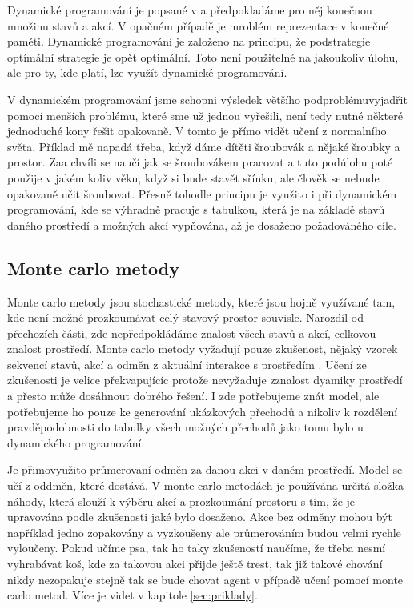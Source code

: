 \documentclass{article}
\begin{document}
Dynamické programování je popsané v \cite{sutton1998introduction} a předpokladáme pro něj konečnou množinu stavů a akcí. V opačném případě je mroblém reprezentace v konečné paměti. Dynamické programování je založeno na principu, že podstrategie optímální strategie je opět optimální. Toto není použitelné na jakoukoliv úlohu, ale pro ty, kde platí, lze využít dynamické programování. 

V dynamickém programování jsme schopni výsledek většího podproblémuvyjadřit pomocí menších problému, které sme už jednou vyřešili, není tedy nutné některé jednoduché kony řešit opakovaně. V tomto je přímo vidět učení z normalního světa. Příklad mě napadá třeba, když dáme dítěti šroubovák a nějaké šroubky a prostor. Zaa chvíli se naučí jak se šroubovákem pracovat a tuto podúlohu poté použije v jakém koliv věku, když si bude stavět sřínku, ale člověk se nebude opakovaně učit šroubovat. Přesně tohodle principu je využito i při dynamickém programování, kde se výhradně pracuje s tabulkou, která je na základě stavů daného prostředí a možných akcí vypňována, až je dosaženo požadováného cíle.

\subsection{Monte carlo metody}
Monte carlo metody jsou stochastické metody, které jsou hojně využívané tam, kde není možné prozkoumávat celý stavový prostor souvisle. Narozdíl od přechozích části, zde nepředpokládáme znalost všech stavů a akcí, celkovou znalost prostředí. Monte carlo metody vyžadují pouze zkušenost, nějaký vzorek sekvencí stavů, akcí a odměn z aktuální interakce s prostředím \cite{sutton1998introduction}. Učení ze zkušenosti je velice překvapujícíc protože nevyžaduje zznalost dyamiky prostředí a přesto může dosáhnout dobrého řešení. I zde potřebujeme znát model, ale potřebujeme ho pouze ke generování ukázkových přechodů a nikoliv k rozdělení pravděpodobnosti do tabulky všech možných přechodů jako tomu bylo u dynamického programování. 

Je přimovyužito průmerovaní odměn za danou akci v daném prostředí. Model se učí z oddměn, které dostává. V monte carlo metodách je používána určitá složka náhody, která slouží k výběru akcí a prozkoumání prostoru s tím, že je upravována podle zkušenosti jaké bylo dosaženo. Akce bez odměny mohou být například jedno zopakovány a vyzkoušeny ale průmerováním budou velmi rychle vyloučeny. Pokud učíme psa, tak ho taky zkušeností naučíme, že třeba nesmí vyhrabávat koš, kde za takovou akci přijde ještě trest, tak již takové chování nikdy nezopakuje stejně tak se bude chovat agent v případě učení pomocí monte carlo metod. Více je videt v kapitole \ref{sec:priklady}. 
\end{document}
